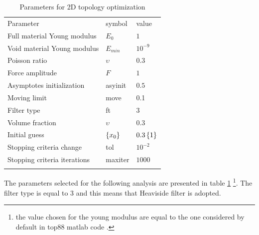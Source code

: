 \begin{table}[h!]
                        \caption{Parameters for 2D topology optimization }
                        \label{tab:2.1}       %
                        \centering
                        \begin{tabular}{lll}
                        \hline\noalign{\smallskip}
                        Parameter & symbol & value\\
                        \noalign{\smallskip}\hline\noalign{\smallskip}
           
                        Full material Young modulus & $E_0$ & $1$\\
                        Void material Young modulus & $E_{min}$ & $10^{-9}$ \\
                        Poisson ratio & $\upsilon$ & $0.3$\\
                        Force amplitude & $F$ & $1$\\
                        Asymptotes initialization & asyinit & $0.5$\\
                        Moving limit & move & 0.1\\
                        Filter type & ft & 3\\
                        Volume fraction & $\upsilon$ & 0.3\\
                        Initial guess & $\left\lbrace{x_0}\right \rbrace$ & $0.3\left\lbrace{1}\right \rbrace$
                       \\ Stopping criteria change & tol & $10^{-2}$\\
                        Stopping criteria iterations & maxiter& $1000$\\
                        \noalign{\smallskip}\hline
                        \end{tabular}
                        \end{table} 
The parameters selected for the following analysis are presented in table \ref{tab:2.1} \footnote{the value chosen for the young modulus are equal to the one considered by default in top88 matlab code \cite{andreassen2011efficient}.}. The filter type is equal to 3 and this means that Heaviside filter is adopted.
\newpage
